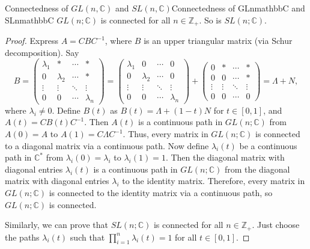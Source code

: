 \documentclass[../main.tex]{subfiles}
\begin{document}
\begin{proposition}{Connectedness of $GL(n,\mathbb{C})$ and $SL(n,\mathbb{C})$}{Connectedness of GLnmathbbC and SLnmathbbC}
	$GL(n;\mathbb{C})$ is connected for all $n \in \mathbb{Z}_+$. So is $SL(n;\mathbb{C})$.
\end{proposition}
\begin{proof}
	Express $A = CBC^{-1}$, where $B$ is an upper triangular matrix (via Schur decomposition). Say
	\begin{equation*}
		B = \begin{pmatrix}
			\lambda_1 & *         & \cdots & *         \\
			0         & \lambda_2 & \cdots & *         \\
			\vdots    & \vdots    & \ddots & \vdots    \\
			0         & 0         & \cdots & \lambda_n
		\end{pmatrix} = \begin{pmatrix}
			\lambda_1 & 0         & \cdots & 0         \\
			0         & \lambda_2 & \cdots & 0         \\
			\vdots    & \vdots    & \ddots & \vdots    \\
			0         & 0         & \cdots & \lambda_n
		\end{pmatrix} + \begin{pmatrix}
			0      & *      & \cdots & *      \\
			0      & 0      & \cdots & *      \\
			\vdots & \vdots & \ddots & \vdots \\
			0      & 0      & \cdots & 0
		\end{pmatrix} = \Lambda + N,
	\end{equation*}
	where $\lambda_i\neq 0$. Define $B(t)$ as $B(t) = \Lambda + (1-t) N$ for $t \in [0,1]$, and $A(t) = C B(t) C^{-1}$. Then $A(t)$ is a continuous path in $GL(n;\mathbb{C})$ from $A(0) = A$ to $A(1) = C \Lambda C^{-1}$. Thus, every matrix in $GL(n;\mathbb{C})$ is connected to a diagonal matrix via a continuous path. Now define $\lambda_i(t)$ be a continuous path in $\mathbb{C}^*$ from $\lambda_i(0) = \lambda_i$ to $\lambda_i(1) = 1$. Then the diagonal matrix with diagonal entries $\lambda_i(t)$ is a continuous path in $GL(n;\mathbb{C})$ from the diagonal matrix with diagonal entries $\lambda_i$ to the identity matrix. Therefore, every matrix in $GL(n;\mathbb{C})$ is connected to the identity matrix via a continuous path, so $GL(n;\mathbb{C})$ is connected.

	Similarly, we can prove that $SL(n;\mathbb{C})$ is connected for all $n \in \mathbb{Z}_+$. Just choose the paths $\lambda_i(t)$ such that $\prod_{i=1}^n \lambda_i(t) = 1$ for all $t \in [0,1]$.
\end{proof}
\end{document}
